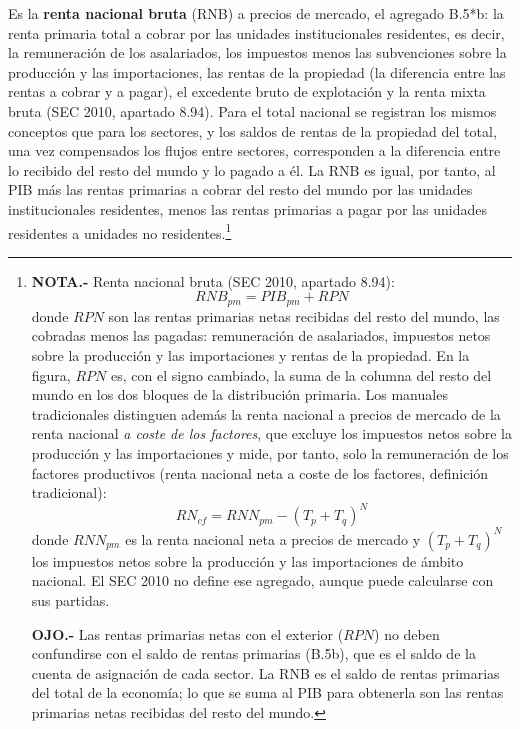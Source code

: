 \documentclass[10pt,a4paper]{article}
\begin{document}
Es la \textbf{renta nacional bruta} (RNB) a precios de mercado, el agregado B.5*b: la renta primaria total a cobrar por las unidades institucionales residentes, es decir, la remuneración de los asalariados, los impuestos menos las subvenciones sobre la producción y las importaciones, las rentas de la propiedad (la diferencia entre las rentas a cobrar y a pagar), el excedente bruto de explotación y la renta mixta bruta (SEC 2010, apartado 8.94). Para el total nacional se registran los mismos conceptos que para los sectores, y los saldos de rentas de la propiedad del total, una vez compensados los flujos entre sectores, corresponden a la diferencia entre lo recibido del resto del mundo y lo pagado a él. La RNB es igual, por tanto, al PIB más las rentas primarias a cobrar del resto del mundo por las unidades institucionales residentes, menos las rentas primarias a pagar por las unidades residentes a unidades no residentes.\footnote{%
    \textbf{NOTA.-} Renta nacional bruta (SEC 2010, apartado 8.94):
    $$RNB_{pm}=PIB_{pm}+RPN$$
    donde $RPN$ son las rentas primarias netas recibidas del resto del mundo, las cobradas menos las pagadas: remuneración de asalariados, impuestos netos sobre la producción y las importaciones y rentas de la propiedad. En la figura, $RPN$ es, con el signo cambiado, la suma de la columna del resto del mundo en los dos bloques de la distribución primaria. Los manuales tradicionales distinguen además la renta nacional a precios de mercado de la renta nacional \textit{a coste de los factores}, que excluye los impuestos netos sobre la producción y las importaciones y mide, por tanto, solo la remuneración de los factores productivos (renta nacional neta a coste de los factores, definición tradicional):
    $$RN_{cf}=RNN_{pm}-\left(T_p+T_q\right)^{N}$$
    donde $RNN_{pm}$ es la renta nacional neta a precios de mercado y $\left(T_p+T_q\right)^{N}$ los impuestos netos sobre la producción y las importaciones de ámbito nacional. El SEC 2010 no define ese agregado, aunque puede calcularse con sus partidas.

    \textbf{OJO.-} Las rentas primarias netas con el exterior ($RPN$) no deben confundirse con el saldo de rentas primarias (B.5b), que es el saldo de la cuenta de asignación de cada sector. La RNB es el saldo de rentas primarias del total de la economía; lo que se suma al PIB para obtenerla son las rentas primarias netas recibidas del resto del mundo.
}
\end{document}
